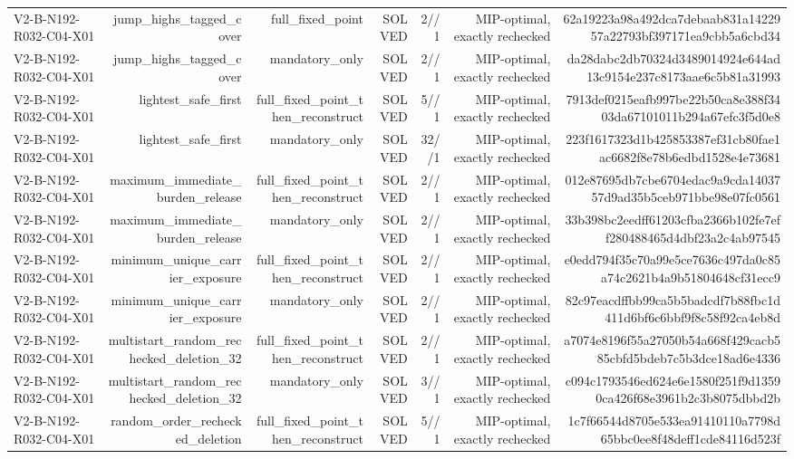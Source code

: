 {\begin{longtable}{lrrrrrr}
V2-B-N192-R032-C04-X01 & jump\_highs\_tagged\_cover & full\_fixed\_point & SOLVED & 2//1 & MIP-optimal, exactly rechecked & 62a19223a98a492dca7debaab831a1422957a22793bf397171ea9cbb5a6cbd34 \\
V2-B-N192-R032-C04-X01 & jump\_highs\_tagged\_cover & mandatory\_only & SOLVED & 2//1 & MIP-optimal, exactly rechecked & da28dabc2db70324d3489014924e644ad13c9154e237c8173aae6c5b81a31993 \\
V2-B-N192-R032-C04-X01 & lightest\_safe\_first & full\_fixed\_point\_then\_reconstruct & SOLVED & 5//1 & MIP-optimal, exactly rechecked & 7913def0215eafb997be22b50ca8e388f3403da67101011b294a67efc3f5d0e8 \\
V2-B-N192-R032-C04-X01 & lightest\_safe\_first & mandatory\_only & SOLVED & 32//1 & MIP-optimal, exactly rechecked & 223f1617323d1b425853387ef31cb80fae1ac6682f8e78b6edbd1528e4e73681 \\
V2-B-N192-R032-C04-X01 & maximum\_immediate\_burden\_release & full\_fixed\_point\_then\_reconstruct & SOLVED & 2//1 & MIP-optimal, exactly rechecked & 012e87695db7cbe6704edac9a9cda1403757d9ad35b5ceb971bbe98e07fc0561 \\
V2-B-N192-R032-C04-X01 & maximum\_immediate\_burden\_release & mandatory\_only & SOLVED & 2//1 & MIP-optimal, exactly rechecked & 33b398bc2eedff61203cfba2366b102fe7eff280488465d4dbf23a2c4ab97545 \\
V2-B-N192-R032-C04-X01 & minimum\_unique\_carrier\_exposure & full\_fixed\_point\_then\_reconstruct & SOLVED & 2//1 & MIP-optimal, exactly rechecked & e0edd794f35c70a99e5ce7636c497da0c85a74c2621b4a9b51804648cf31ecc9 \\
V2-B-N192-R032-C04-X01 & minimum\_unique\_carrier\_exposure & mandatory\_only & SOLVED & 2//1 & MIP-optimal, exactly rechecked & 82c97eacdffbb99ca5b5badcdf7b88fbc1d411d6bf6c6bbf9f8c58f92ca4eb8d \\
V2-B-N192-R032-C04-X01 & multistart\_random\_rechecked\_deletion\_32 & full\_fixed\_point\_then\_reconstruct & SOLVED & 2//1 & MIP-optimal, exactly rechecked & a7074e8196f55a27050b54a668f429cacb585cbfd5bdeb7c5b3dce18ad6e4336 \\
V2-B-N192-R032-C04-X01 & multistart\_random\_rechecked\_deletion\_32 & mandatory\_only & SOLVED & 3//1 & MIP-optimal, exactly rechecked & c094c1793546ed624e6e1580f251f9d13590ca426f68e3961b2c3b8075dbbd2b \\
V2-B-N192-R032-C04-X01 & random\_order\_rechecked\_deletion & full\_fixed\_point\_then\_reconstruct & SOLVED & 5//1 & MIP-optimal, exactly rechecked & 1c7f66544d8705e533ea91410110a7798d65bbc0ee8f48deff1cde84116d523f \\

\end{longtable}}
